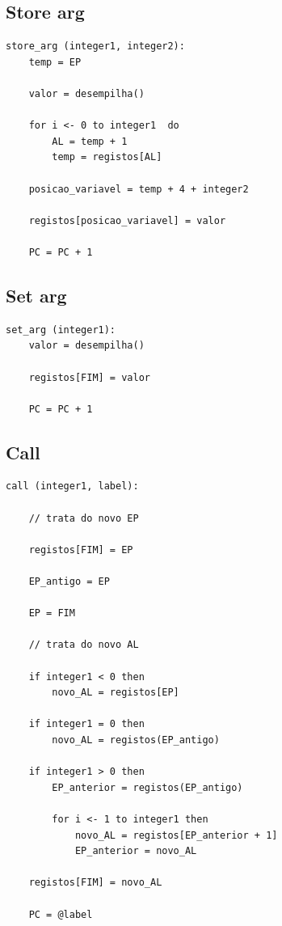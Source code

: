 \documentclass[a4paper,12pt,headings=small]{article}
\begin{document}
\subsection{Store arg}
\begin{lstlisting}
store_arg (integer1, integer2):
	temp = EP	
	
	valor = desempilha()
	
	for i <- 0 to integer1	do
		AL = temp + 1
		temp = registos[AL]
	
	posicao_variavel = temp + 4 + integer2
	
	registos[posicao_variavel] = valor
	
	PC = PC + 1

\end{lstlisting}


\subsection{Set arg}
\begin{lstlisting}
set_arg (integer1):
	valor = desempilha()
	
	registos[FIM] = valor
	
	PC = PC + 1

\end{lstlisting}

\newpage

\subsection{Call}
\begin{lstlisting}
call (integer1, label):

	// trata do novo EP
	
	registos[FIM] = EP

	EP_antigo = EP
	
	EP = FIM
	
	// trata do novo AL
	
	if integer1 < 0 then
		novo_AL = registos[EP]
		
	if integer1 = 0 then
		novo_AL = registos(EP_antigo)
		
	if integer1 > 0 then
		EP_anterior = registos(EP_antigo)
		
		for i <- 1 to integer1 then
			novo_AL = registos[EP_anterior + 1]
			EP_anterior = novo_AL
			
	registos[FIM] = novo_AL
		
	PC = @label

\end{lstlisting}
\end{document}
